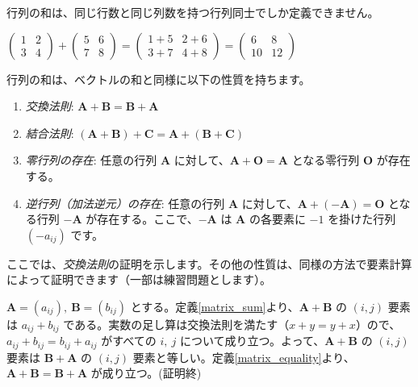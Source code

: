 \begin{rmk*}
行列の和は、同じ行数と同じ列数を持つ行列同士でしか定義できません。
\end{rmk*}

\begin{ex}
$\begin{pmatrix} 1 & 2 \\ 3 & 4 \end{pmatrix} + \begin{pmatrix} 5 & 6 \\ 7 & 8 \end{pmatrix} = \begin{pmatrix} 1+5 & 2+6 \\ 3+7 & 4+8 \end{pmatrix} = \begin{pmatrix} 6 & 8 \\ 10 & 12 \end{pmatrix}$
\end{ex}

\begin{thm}[行列の和の性質] \label{matrix_sum_property}
行列の和は、ベクトルの和と同様に以下の性質を持ちます。
\begin{enumerate}
\item \emph{交換法則}: $\bm{A} + \bm{B} = \bm{B} + \bm{A}$
\item \emph{結合法則}: $(\bm{A} + \bm{B}) + \bm{C} = \bm{A} + (\bm{B} + \bm{C})$
\item \emph{零行列の存在}: 任意の行列 $\bm{A}$ に対して、$\bm{A} + \bm{O} = \bm{A}$ となる零行列 $\bm{O}$ が存在する。
\item \emph{逆行列（加法逆元）の存在}: 任意の行列 $\bm{A}$ に対して、$\bm{A} + (-\bm{A}) = \bm{O}$ となる行列 $-\bm{A}$ が存在する。ここで、$-\bm{A}$ は $\bm{A}$ の各要素に $-1$ を掛けた行列 $(-a_{ij})$ です。
\end{enumerate}
\begin{proof*}
ここでは、\emph{交換法則}の証明を示します。その他の性質は、同様の方法で要素計算によって証明できます（一部は練習問題とします）。\par
$\bm{A} = (a_{ij}),\ \bm{B} = (b_{ij})$ とする。定義\ref{matrix_sum}より、$\bm{A} + \bm{B}$ の $(i,j)$ 要素は $a_{ij} + b_{ij}$ である。実数の足し算は交換法則を満たす（$x+y = y+x$）ので、$a_{ij} + b_{ij} = b_{ij} + a_{ij}$ がすべての $i,\ j$ について成り立つ。よって、$\bm{A} + \bm{B}$ の $(i,j)$ 要素は $\bm{B} + \bm{A}$ の $(i,j)$ 要素と等しい。定義\ref{matrix_equality}より、$\bm{A} + \bm{B} = \bm{B} + \bm{A}$ が成り立つ。(証明終)
\end{proof*}
\end{thm}

